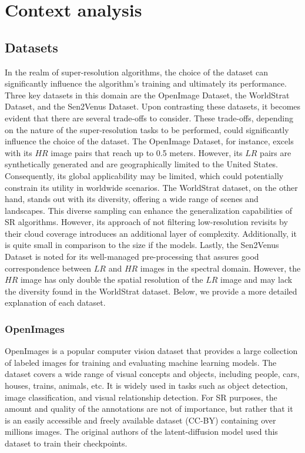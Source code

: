 \chapter{Context analysis}

\section{Datasets}
\label{chapter:datasets}
In the realm of super-resolution algorithms, the choice of the dataset can significantly influence the algorithm's training and ultimately its performance. Three key datasets in this domain are the OpenImage Dataset, the WorldStrat Dataset, and the Sen2Venus Dataset. Upon contrasting these datasets, it becomes evident that there are several trade-offs to consider. These trade-offs, depending on the nature of the super-resolution tasks to be performed, could significantly influence the choice of the dataset. The OpenImage Dataset, for instance, excels with its $HR$ image pairs that reach up to 0.5 meters. However, its $LR$ pairs are synthetically generated and are geographically limited to the United States. Consequently, its global applicability may be limited, which could potentially constrain its utility in worldwide scenarios. The WorldStrat dataset, on the other hand, stands out with its diversity, offering a wide range of scenes and landscapes. This diverse sampling can enhance the generalization capabilities of SR algorithms. However, its approach of not filtering low-resolution revisits by their cloud coverage introduces an additional layer of complexity. Additionally, it is quite small in comparison to the size if the models. Lastly, the Sen2Venus Dataset is noted for its well-managed pre-processing that assures good correspondence between $LR$ and $HR$ images in the spectral domain. However, the $HR$ image has only double the spatial resolution of the $LR$ image and may lack the diversity found in the WorldStrat dataset. Below, we provide a more detailed explanation of each dataset.

\subsection{OpenImages}
OpenImages is a popular computer vision dataset that provides a large collection of labeled images for training and evaluating machine learning models. The dataset covers a wide range of visual concepts and objects, including people, cars, houses, trains, animals, etc.  It is widely used in tasks such as object detection, image classification, and visual relationship detection. For SR purposes, the amount and quality of the annotations are not of importance, but rather that it is an easily accessible and freely available dataset (CC-BY) containing over  millions images. The original authors of the latent-diffusion model used this dataset to train their checkpoints.

